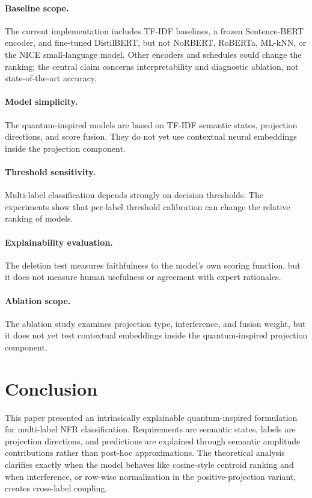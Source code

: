 \documentclass[runningheads]{llncs}
\begin{document}
\paragraph{Baseline scope.} The current implementation includes TF-IDF baselines,
a frozen Sentence-BERT encoder, and fine-tuned DistilBERT, but not NoRBERT,
RoBERTa, ML-kNN, or the NICE small-language model. Other encoders and schedules
could change the ranking; the central claim concerns interpretability and
diagnostic ablation, not state-of-the-art accuracy.

\paragraph{Model simplicity.} The quantum-inspired models are based on TF-IDF
semantic states, projection directions, and score fusion. They do not yet use
contextual neural embeddings inside the projection component.

\paragraph{Threshold sensitivity.} Multi-label classification depends strongly on
decision thresholds. The experiments show that per-label threshold calibration
can change the relative ranking of models.

\paragraph{Explainability evaluation.} The deletion test measures faithfulness to
the model's own scoring function, but it does not measure human usefulness or
agreement with expert rationales.

\paragraph{Ablation scope.} The ablation study examines projection type,
interference, and fusion weight, but it does not yet test contextual embeddings
inside the quantum-inspired projection component.

\section{Conclusion}
This paper presented an intrinsically explainable quantum-inspired formulation
for multi-label NFR classification. Requirements are semantic states, labels
are projection directions, and predictions are explained through semantic
amplitude contributions rather than post-hoc approximations. The theoretical
analysis clarifies exactly when the model behaves like cosine-style centroid
ranking and when interference, or row-wise normalization in the
positive-projection variant, creates cross-label coupling.
\end{document}
